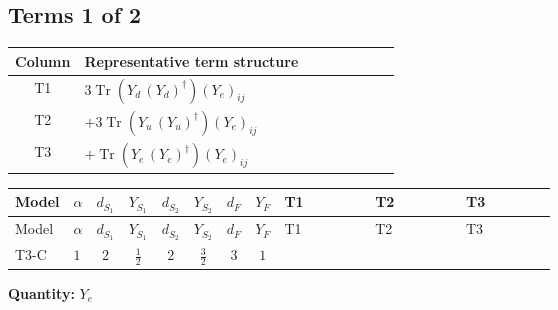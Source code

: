 \documentclass[8pt]{article}
\begin{document}
\begin{landscape}
\subsection*{Terms 1 of 2}
\begin{center}
\begin{tabular}{@{}c >{\raggedright\arraybackslash}p{0.82\linewidth}@{}}
\toprule
Column & Representative term structure \\
\midrule
T1 & \(\displaystyle 3 \operatorname{Tr}\!\left({Y_d}\,\left({Y_d}\right)^{\dagger}\right) \left({Y_e}\right)_{ij}\) \\
\midrule
T2 & \(\displaystyle +3 \operatorname{Tr}\!\left({Y_u}\,\left({Y_u}\right)^{\dagger}\right) \left({Y_e}\right)_{ij}\) \\
\midrule
T3 & \(\displaystyle +\operatorname{Tr}\!\left({Y_e}\,\left({Y_e}\right)^{\dagger}\right) \left({Y_e}\right)_{ij}\) \\
\midrule
\bottomrule
\end{tabular}
\end{center}
\smallskip
\tiny
\begin{longtable}{@{}llcccccc >{\raggedright\arraybackslash}p{0.21\linewidth} >{\raggedright\arraybackslash}p{0.21\linewidth} >{\raggedright\arraybackslash}p{0.21\linewidth}@{}}
\toprule
Model & $\alpha$ & $d_{S_1}$ & $Y_{S_1}$ & $d_{S_2}$ & $Y_{S_2}$ & $d_F$ & $Y_F$ & T1 & T2 & T3 \\
\midrule
\endfirsthead
\toprule
Model & $\alpha$ & $d_{S_1}$ & $Y_{S_1}$ & $d_{S_2}$ & $Y_{S_2}$ & $d_F$ & $Y_F$ & T1 & T2 & T3 \\
\midrule
\endhead
T3-C & $1$ & $2$ & $\frac{1}{2}$ & $2$ & $\frac{3}{2}$ & $3$ & $1$ & \scriptsize\adjustbox{max width=\linewidth}{$\begin{gathered} 3 \operatorname{Tr}\!\left({Y_d}\,\left({Y_d}\right)^{\dagger}\right) \left({Y_e}\right)_{ij}\end{gathered}$} & \scriptsize\adjustbox{max width=\linewidth}{$\begin{gathered} +3 \operatorname{Tr}\!\left({Y_u}\,\left({Y_u}\right)^{\dagger}\right) \left({Y_e}\right)_{ij}\end{gathered}$} & \scriptsize\adjustbox{max width=\linewidth}{$\begin{gathered} +\operatorname{Tr}\!\left({Y_e}\,\left({Y_e}\right)^{\dagger}\right) \left({Y_e}\right)_{ij}\end{gathered}$} \\
\midrule
\bottomrule
\end{longtable}
\clearpage
\noindent\textbf{Quantity: }$Y_e$\par\smallskip

\end{landscape}
\end{document}
